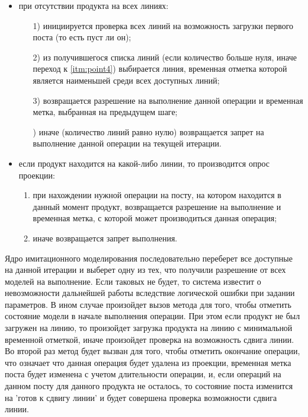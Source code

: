 \begin{itemize}
	\item при отсутствии продукта на всех линиях:
		\begin{enumerate}
			\item[1)] инициируется проверка всех линий на возможность загрузки первого поста (то есть пуст ли он);
			\item[2)] из получившегося списка линий (если количество больше нуля, иначе переход к \ref{itm:point4}) выбирается линия, временная отметка которой является наименьшей среди всех доступных линий;
			\item[3)] возвращается разрешение на выполнение данной операции и временная метка, выбранная на предыдущем шаге;
			\item[\mylabel{itm:point4}{4})] иначе (количество линий равно нулю) возвращается запрет на выполнение данной операции на текущей итерации.
		\end{enumerate}
	\item если продукт находится на какой-либо линии, то производится опрос проекции:
		\begin{enumerate}
			\item при нахождении нужной операции на посту, на котором находится в данный момент продукт, возвращается разрешение на выполнение и временная метка, с которой может производиться данная операция;
			\item иначе возвращается запрет выполнения.
		\end{enumerate}
\end{itemize}

\indent Ядро имитационного моделирования последовательно переберет все доступные на данной итерации и выберет одну из тех, что получили разрешение от всех моделей на выполнение.
Если таковых не будет, то система известит о невозможности дальнейшей работы вследствие логической ошибки при задании параметров.
В ином случае произойдет вызов метода для того, чтобы отметить состояние модели в начале выполнения операции.
При этом если продукт не был загружен на линию, то произойдет загрузка продукта на линию с минимальной временной отметкой, иначе произойдет проверка на возможность сдвига линии.\\
\indent Во второй раз метод будет вызван для того, чтобы отметить окончание операции, что означает что данная операция будет удалена из проекции, временная метка поста будет изменена с учетом длительности операции, и, если операций на данном посту для данного продукта не осталось, то состояние поста изменится на 'готов к сдвигу линии' и будет совершена проверка возможности сдвига линии.

